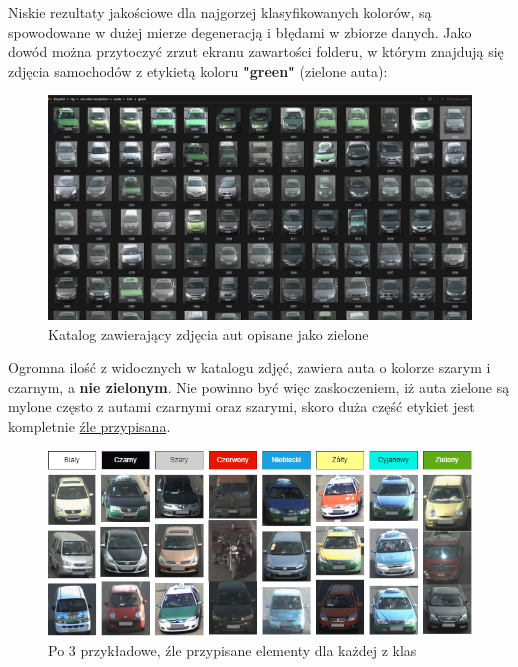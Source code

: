 \pagebreak

Niskie rezultaty jakościowe dla najgorzej klasyfikowanych kolorów, są spowodowane w dużej mierze degeneracją i błędami w zbiorze danych. Jako dowód można przytoczyć zrzut ekranu zawartości folderu, w którym znajdują się zdjęcia samochodów z etykietą koloru \textbf{"\null{}green"} (zielone auta):

\begin{figure}[h!]
    \begin{center}
        \includegraphics[scale=0.31]{img/green_cars_xd.png}        
    \end{center}
    \caption{Katalog zawierający zdjęcia aut opisane jako zielone}
    \label{fig:green_cars_xd}
\end{figure}

Ogromna ilość z widocznych w katalogu zdjęć, zawiera auta o kolorze szarym i czarnym, a \textbf{nie zielonym}. Nie powinno być więc zaskoczeniem, iż auta zielone są mylone często z autami czarnymi oraz szarymi, skoro duża część etykiet jest kompletnie \underline{źle przypisana}. 

\begin{figure}[h!]
    \begin{center}
        \includegraphics[scale=0.57]{img/cars_bad_colors.png}        
    \end{center}
    \caption{Po 3 przykładowe, źle przypisane elementy dla każdej z klas}
    \label{fig:bad_cars_xd}
\end{figure}

